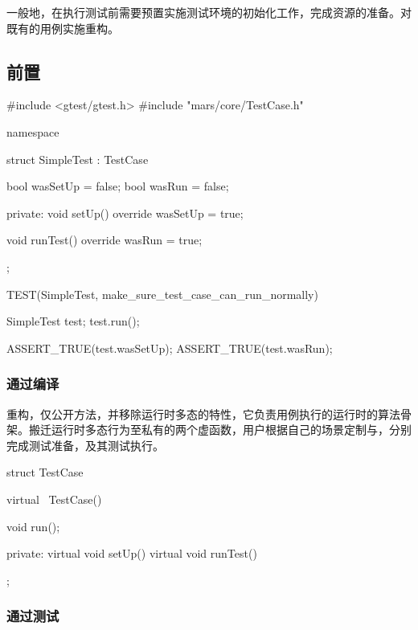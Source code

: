 \begin{content}

一般地，在执行测试前需要预置实施测试环境的初始化工作，完成资源的准备。对既有的用例实施重构。

\subsection{前置}

\begin{leftbar}
 \begin{c++}[caption={\ttfamily{test/mars/core/TestCaseSpec.cc}}]
#include <gtest/gtest.h>
#include "mars/core/TestCase.h"

namespace {
  struct SimpleTest : TestCase {
    bool wasSetUp = false;
    bool wasRun = false;

  private:
    void setUp() override {
      wasSetUp = true;
    }

    void runTest() override {
      wasRun = true;
    }
  };
}

TEST(SimpleTest, make_sure_test_case_can_run_normally) {
  SimpleTest test;
  test.run();

  ASSERT_TRUE(test.wasSetUp);
  ASSERT_TRUE(test.wasRun);
}
 \end{c++}
\end{leftbar}

\subsubsection{通过编译}

重构，仅公开方法，并移除运行时多态的特性，它负责用例执行的运行时的算法骨架。搬迁运行时多态行为至私有的两个虚函数，用户根据自己的场景定制与，分别完成测试准备，及其测试执行。

\begin{leftbar}
 \begin{c++}[caption={\ttfamily{include/mars/core/TestCase.h}}]
struct TestCase {
  virtual ~TestCase() {}

  void run();

private:
  virtual void setUp() {}
  virtual void runTest() {}
};
  \end{c++}
\end{leftbar}

\subsubsection{通过测试}


\end{content}
